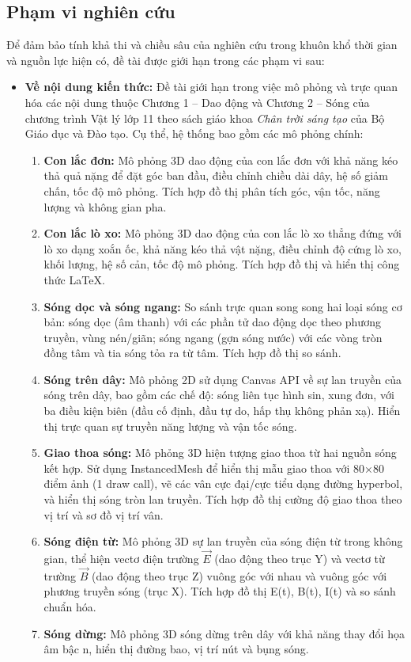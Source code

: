 \subsection{Phạm vi nghiên cứu}
Để đảm bảo tính khả thi và chiều sâu của nghiên cứu trong khuôn khổ thời gian và nguồn lực hiện có, đề tài được giới hạn trong các phạm vi sau:

\begin{itemize}
    \item \textbf{Về nội dung kiến thức:} Đề tài giới hạn trong việc mô phỏng và trực quan hóa các nội dung thuộc Chương 1 – Dao động và Chương 2 – Sóng của chương trình Vật lý lớp 11 theo sách giáo khoa \textit{Chân trời sáng tạo} của Bộ Giáo dục và Đào tạo. Cụ thể, hệ thống bao gồm các mô phỏng chính:
    \begin{enumerate}
        \item \textbf{Con lắc đơn:} Mô phỏng 3D dao động của con lắc đơn với khả năng kéo thả quả nặng để đặt góc ban đầu, điều chỉnh chiều dài dây, hệ số giảm chấn, tốc độ mô phỏng. Tích hợp đồ thị phân tích góc, vận tốc, năng lượng và không gian pha.
        \item \textbf{Con lắc lò xo:} Mô phỏng 3D dao động của con lắc lò xo thẳng đứng với lò xo dạng xoắn ốc, khả năng kéo thả vật nặng, điều chỉnh độ cứng lò xo, khối lượng, hệ số cản, tốc độ mô phỏng. Tích hợp đồ thị và hiển thị công thức LaTeX.
        \item \textbf{Sóng dọc và sóng ngang:} So sánh trực quan song song hai loại sóng cơ bản: sóng dọc (âm thanh) với các phần tử dao động dọc theo phương truyền, vùng nén/giãn; sóng ngang (gợn sóng nước) với các vòng tròn đồng tâm và tia sóng tỏa ra từ tâm. Tích hợp đồ thị so sánh.
        \item \textbf{Sóng trên dây:} Mô phỏng 2D sử dụng Canvas API về sự lan truyền của sóng trên dây, bao gồm các chế độ: sóng liên tục hình sin, xung đơn, với ba điều kiện biên (đầu cố định, đầu tự do, hấp thụ không phản xạ). Hiển thị trực quan sự truyền năng lượng và vận tốc sóng.
        \item \textbf{Giao thoa sóng:} Mô phỏng 3D hiện tượng giao thoa từ hai nguồn sóng kết hợp. Sử dụng InstancedMesh để hiển thị mẫu giao thoa với 80×80 điểm ảnh (1 draw call), vẽ các vân cực đại/cực tiểu dạng đường hyperbol, và hiển thị sóng tròn lan truyền. Tích hợp đồ thị cường độ giao thoa theo vị trí và sơ đồ vị trí vân.
        \item \textbf{Sóng điện từ:} Mô phỏng 3D sự lan truyền của sóng điện từ trong không gian, thể hiện vectơ điện trường $\vec{E}$ (dao động theo trục Y) và vectơ từ trường $\vec{B}$ (dao động theo trục Z) vuông góc với nhau và vuông góc với phương truyền sóng (trục X). Tích hợp đồ thị E(t), B(t), I(t) và so sánh chuẩn hóa.
        \item \textbf{Sóng dừng:} Mô phỏng 3D sóng dừng trên dây với khả năng thay đổi họa âm bậc n, hiển thị đường bao, vị trí nút và bụng sóng.
    \end{enumerate}
    

\end{itemize}
